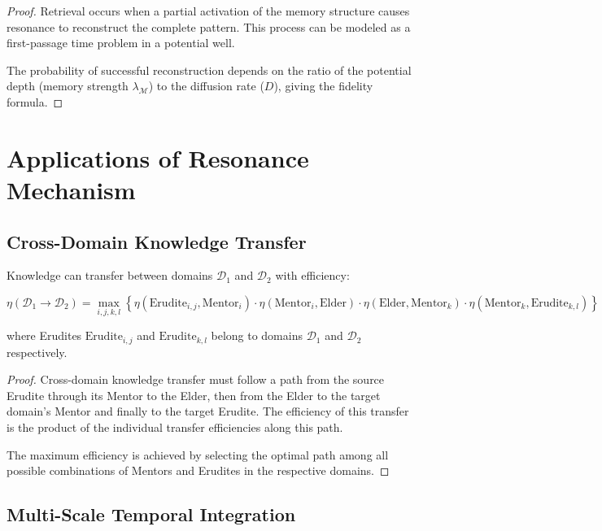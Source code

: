 \begin{proof}
Retrieval occurs when a partial activation of the memory structure causes resonance to reconstruct the complete pattern. This process can be modeled as a first-passage time problem in a potential well.

The probability of successful reconstruction depends on the ratio of the potential depth (memory strength $\lambda_{\mathcal{M}}$) to the diffusion rate ($D$), giving the fidelity formula.
\end{proof}

\section{Applications of Resonance Mechanism}

\subsection{Cross-Domain Knowledge Transfer}

\begin{theorem}
Knowledge can transfer between domains $\mathcal{D}_1$ and $\mathcal{D}_2$ with efficiency:

\begin{equation}
\eta(\mathcal{D}_1 \to \mathcal{D}_2) = \max_{i,j,k,l} \left\{\eta(\text{Erudite}_{i,j}, \text{Mentor}_i) \cdot \eta(\text{Mentor}_i, \text{Elder}) \cdot \eta(\text{Elder}, \text{Mentor}_k) \cdot \eta(\text{Mentor}_k, \text{Erudite}_{k,l})\right\}
\end{equation}

where Erudites $\text{Erudite}_{i,j}$ and $\text{Erudite}_{k,l}$ belong to domains $\mathcal{D}_1$ and $\mathcal{D}_2$ respectively.
\end{theorem}

\begin{proof}
Cross-domain knowledge transfer must follow a path from the source Erudite through its Mentor to the Elder, then from the Elder to the target domain's Mentor and finally to the target Erudite. The efficiency of this transfer is the product of the individual transfer efficiencies along this path.

The maximum efficiency is achieved by selecting the optimal path among all possible combinations of Mentors and Erudites in the respective domains.
\end{proof}

\subsection{Multi-Scale Temporal Integration}

